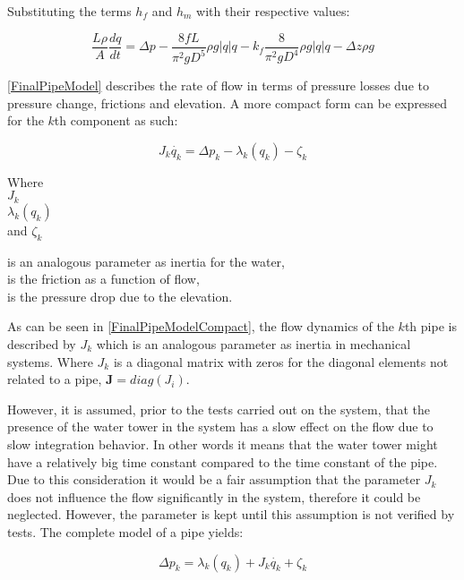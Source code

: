 Substituting the terms $h_f$ and $h_m$ with their respective values:

\begin{equation}
\label{FinalPipeModel}
   \frac{L \rho}{A} \frac{dq}{dt} =\Delta p - \frac{8fL}{\pi^{2}gD^5} \rho g  |q| q - k_f \frac{8}{\pi^2gD^4} \rho g |q| q - \Delta z \rho g 
\end{equation}

\eqref{FinalPipeModel} describes the rate of flow in terms of pressure losses due to pressure change, frictions and elevation. A more compact form can be expressed for the $k$th component as such:

\begin{equation}
\label{FinalPipeModelCompact}
   J_k \dot{q_k} = \Delta p_k - \lambda_k(q_k) - \zeta_k 
\end{equation}

 \begin{minipage}[t]{0.20\textwidth}
Where\\
\hspace*{8mm} $J_k$ \\
\hspace*{8mm} $\lambda_k(q_k)$ \\
and \hspace*{0.7mm} $\zeta_k$ 
\end{minipage}
\begin{minipage}[t]{0.68\textwidth}
\vspace*{2mm}
is an analogous parameter as inertia for the water,\\ 
is the friction as a function of flow,\\
is the pressure drop due to the elevation.
\end{minipage}

As can be seen in \eqref{FinalPipeModelCompact}, the flow dynamics of the $k$th pipe is described by $J_k$ which is an analogous parameter as inertia in mechanical systems. Where $J_k$ is a diagonal matrix with zeros for the diagonal elements not related to a pipe, $\pmb{J} = diag(J_i)$.

However, it is assumed, prior to the tests carried out on the system, that the presence of the water tower in the system has a slow effect on the flow due to slow integration behavior. In other words it means that the water tower might have a relatively big time constant compared to the time constant of the pipe. Due to this consideration it would be a fair assumption that the parameter $J_k$ does not influence the flow significantly in the system, therefore it could be neglected. However, the parameter is kept until this assumption is not verified by tests. The complete model of a pipe yields: 
  
\begin{equation}
\label{FinalPipeModelSimplified}
  \Delta p_k  =   \lambda_k(q_k) + J_k \dot{q_k} + \zeta_k 
\end{equation}


